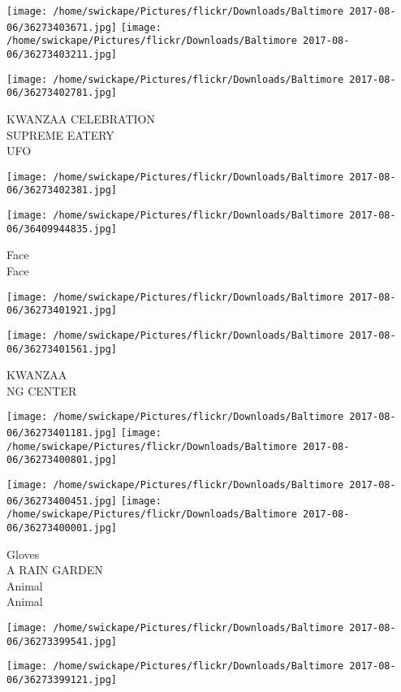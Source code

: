 \documentclass[10pt,letterpaper]{article}
\begin{document}
\texttt{[image: /home/swickape/Pictures/flickr/Downloads/Baltimore 2017-08-06/36273403671.jpg]}
\texttt{[image: /home/swickape/Pictures/flickr/Downloads/Baltimore 2017-08-06/36273403211.jpg]}

\texttt{[image: /home/swickape/Pictures/flickr/Downloads/Baltimore 2017-08-06/36273402781.jpg]}

KWANZAA CELEBRATION\\
SUPREME EATERY\\
UFO
\pagebreak

\texttt{[image: /home/swickape/Pictures/flickr/Downloads/Baltimore 2017-08-06/36273402381.jpg]}

\vspace{0.25in}
\texttt{[image: /home/swickape/Pictures/flickr/Downloads/Baltimore 2017-08-06/36409944835.jpg]}

Face\\
Face
\pagebreak

\texttt{[image: /home/swickape/Pictures/flickr/Downloads/Baltimore 2017-08-06/36273401921.jpg]}

\vspace{0.25in}
\texttt{[image: /home/swickape/Pictures/flickr/Downloads/Baltimore 2017-08-06/36273401561.jpg]}

KWANZAA\\
NG CENTER
\pagebreak

\texttt{[image: /home/swickape/Pictures/flickr/Downloads/Baltimore 2017-08-06/36273401181.jpg]}
\texttt{[image: /home/swickape/Pictures/flickr/Downloads/Baltimore 2017-08-06/36273400801.jpg]}

\texttt{[image: /home/swickape/Pictures/flickr/Downloads/Baltimore 2017-08-06/36273400451.jpg]}
\texttt{[image: /home/swickape/Pictures/flickr/Downloads/Baltimore 2017-08-06/36273400001.jpg]}

Gloves\\
A RAIN GARDEN\\
Animal\\
Animal
\pagebreak

\texttt{[image: /home/swickape/Pictures/flickr/Downloads/Baltimore 2017-08-06/36273399541.jpg]}

\vspace{0.25in}
\texttt{[image: /home/swickape/Pictures/flickr/Downloads/Baltimore 2017-08-06/36273399121.jpg]}
\end{document}
